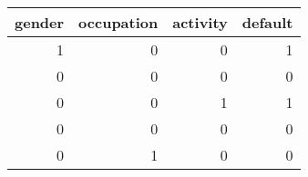 \begin{tabular}{rrrr}
\toprule
 gender &  occupation &  activity &  default \\
\midrule
      1 &           0 &         0 &        1 \\
      0 &           0 &         0 &        0 \\
      0 &           0 &         1 &        1 \\
      0 &           0 &         0 &        0 \\
      0 &           1 &         0 &        0 \\
\bottomrule
\end{tabular}

